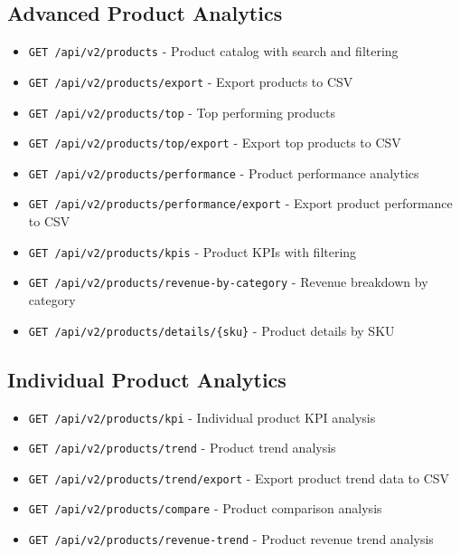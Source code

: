 \documentclass[11pt,a4paper]{article}
\begin{document}
\subsection{Advanced Product Analytics}
\begin{itemize}[leftmargin=*]
    \item \texttt{GET /api/v2/products} - Product catalog with search and filtering
    \item \texttt{GET /api/v2/products/export} - Export products to CSV
    \item \texttt{GET /api/v2/products/top} - Top performing products
    \item \texttt{GET /api/v2/products/top/export} - Export top products to CSV
    \item \texttt{GET /api/v2/products/performance} - Product performance analytics
    \item \texttt{GET /api/v2/products/performance/export} - Export product performance to CSV
    \item \texttt{GET /api/v2/products/kpis} - Product KPIs with filtering
    \item \texttt{GET /api/v2/products/revenue-by-category} - Revenue breakdown by category
    \item \texttt{GET /api/v2/products/details/\{sku\}} - Product details by SKU
\end{itemize}

\subsection{Individual Product Analytics}
\begin{itemize}[leftmargin=*]
    \item \texttt{GET /api/v2/products/kpi} - Individual product KPI analysis
    \item \texttt{GET /api/v2/products/trend} - Product trend analysis
    \item \texttt{GET /api/v2/products/trend/export} - Export product trend data to CSV
    \item \texttt{GET /api/v2/products/compare} - Product comparison analysis
    \item \texttt{GET /api/v2/products/revenue-trend} - Product revenue trend analysis
\end{itemize}
\end{document}

